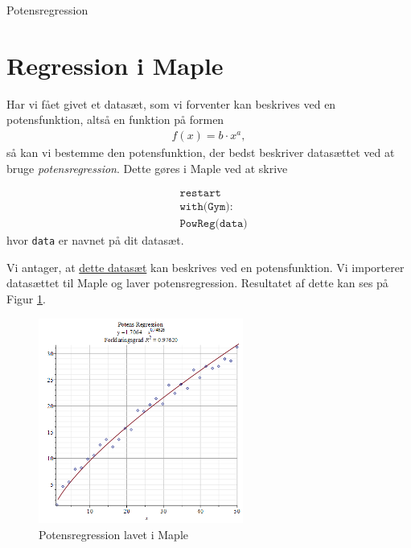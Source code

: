
\begin{center}
\Huge
Potensregression
\end{center}

\section*{Regression i Maple}

Har vi fået givet et datasæt, som vi forventer kan beskrives ved en potensfunktion, altså en funktion på formen
\begin{align*}
	f(x) = b\cdot x^a,
\end{align*}
så kan vi bestemme den potensfunktion, der bedst beskriver datasættet ved at bruge \textit{potensregression}. Dette gøres i Maple ved at skrive

\begin{align*}
	&\texttt{restart}\\
	&\texttt{with(Gym):}\\
	&\texttt{PowReg(data)}
\end{align*}
hvor \texttt{data} er navnet på dit datasæt.

\begin{exa}
	Vi antager, at \href{https://github.com/ChristianJLex/TeachingNotes/raw/master/2023-2024/Data og lign/PotensData.xlsx}{\color{blue!60} dette datasæt} kan beskrives ved en potensfunktion.
	Vi importerer datasættet til Maple og laver potensregression. Resultatet af dette kan ses 
	på Figur \ref{fig:potensregression}.
	\begin{figure}[H]
		\centering
		\includegraphics[width=0.6\textwidth]{Billeder/Potensregression}
		\caption{Potensregression lavet i Maple}
		\label{fig:potensregression}
	\end{figure}
\end{exa}


